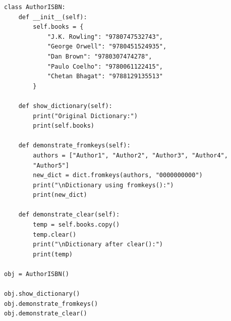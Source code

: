 \begin{verbatim}
class AuthorISBN:
    def __init__(self):
        self.books = {
            "J.K. Rowling": "9780747532743",
            "George Orwell": "9780451524935",
            "Dan Brown": "9780307474278",
            "Paulo Coelho": "9780061122415",
            "Chetan Bhagat": "9788129135513"
        }

    def show_dictionary(self):
        print("Original Dictionary:")
        print(self.books)

    def demonstrate_fromkeys(self):
        authors = ["Author1", "Author2", "Author3", "Author4", 
        "Author5"]
        new_dict = dict.fromkeys(authors, "0000000000")
        print("\nDictionary using fromkeys():")
        print(new_dict)

    def demonstrate_clear(self):
        temp = self.books.copy()
        temp.clear()
        print("\nDictionary after clear():")
        print(temp)

obj = AuthorISBN()

obj.show_dictionary()
obj.demonstrate_fromkeys()
obj.demonstrate_clear()
\end{verbatim}